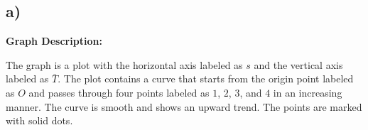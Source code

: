 

\subsection*{a)}

\begin{center}
\textbf{Graph Description:}
\end{center}

The graph is a plot with the horizontal axis labeled as $s$ and the vertical axis labeled as $\bar{T}$. The plot contains a curve that starts from the origin point labeled as $O$ and passes through four points labeled as $1$, $2$, $3$, and $4$ in an increasing manner. The curve is smooth and shows an upward trend. The points are marked with solid dots.